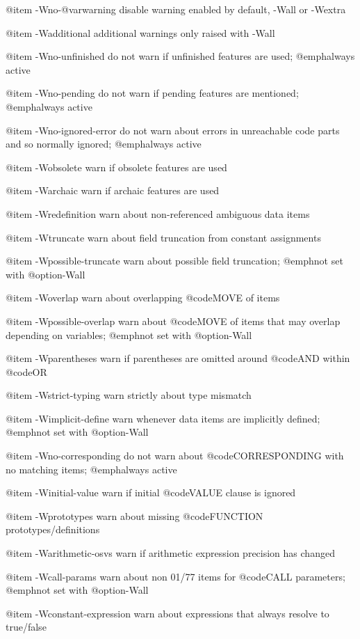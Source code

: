 @item -Wno-@var{warning}
disable warning enabled by default, -Wall or -Wextra

@item -Wadditional
additional warnings only raised with -Wall

@item -Wno-unfinished
do not warn if unfinished features are used; @emph{always} active

@item -Wno-pending
do not warn if pending features are mentioned; @emph{always} active

@item -Wno-ignored-error
do not warn about errors in unreachable code parts and so normally ignored; @emph{always} active

@item -Wobsolete
warn if obsolete features are used

@item -Warchaic
warn if archaic features are used

@item -Wredefinition
warn about non-referenced ambiguous data items

@item -Wtruncate
warn about field truncation from constant assignments

@item -Wpossible-truncate
warn about possible field truncation; @emph{not} set with @option{-Wall}

@item -Woverlap
warn about overlapping @code{MOVE} of items

@item -Wpossible-overlap
warn about @code{MOVE} of items that may overlap depending on variables; @emph{not} set with @option{-Wall}

@item -Wparentheses
warn if parentheses are omitted around @code{AND} within @code{OR}

@item -Wstrict-typing
warn strictly about type mismatch

@item -Wimplicit-define
warn whenever data items are implicitly defined; @emph{not} set with @option{-Wall}

@item -Wno-corresponding
do not warn about @code{CORRESPONDING} with no matching items; @emph{always} active

@item -Winitial-value
warn if initial @code{VALUE} clause is ignored

@item -Wprototypes
warn about missing @code{FUNCTION} prototypes/definitions

@item -Warithmetic-osvs
warn if arithmetic expression precision has changed

@item -Wcall-params
warn about non 01/77 items for @code{CALL} parameters; @emph{not} set with @option{-Wall}

@item -Wconstant-expression
warn about expressions that always resolve to true/false


